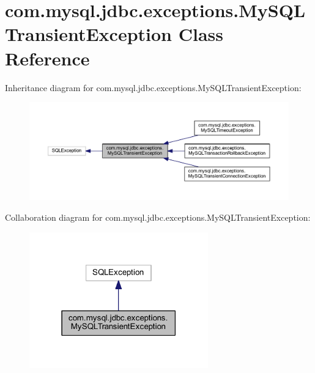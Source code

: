 \hypertarget{classcom_1_1mysql_1_1jdbc_1_1exceptions_1_1_my_s_q_l_transient_exception}{}\section{com.\+mysql.\+jdbc.\+exceptions.\+My\+S\+Q\+L\+Transient\+Exception Class Reference}
\label{classcom_1_1mysql_1_1jdbc_1_1exceptions_1_1_my_s_q_l_transient_exception}


Inheritance diagram for com.\+mysql.\+jdbc.\+exceptions.\+My\+S\+Q\+L\+Transient\+Exception\+:
\nopagebreak
\begin{figure}[H]
\begin{center}
\leavevmode
\includegraphics[width=350pt]{classcom_1_1mysql_1_1jdbc_1_1exceptions_1_1_my_s_q_l_transient_exception__inherit__graph}
\end{center}
\end{figure}


Collaboration diagram for com.\+mysql.\+jdbc.\+exceptions.\+My\+S\+Q\+L\+Transient\+Exception\+:
\nopagebreak
\begin{figure}[H]
\begin{center}
\leavevmode
\includegraphics[width=219pt]{classcom_1_1mysql_1_1jdbc_1_1exceptions_1_1_my_s_q_l_transient_exception__coll__graph}
\end{center}
\end{figure}
